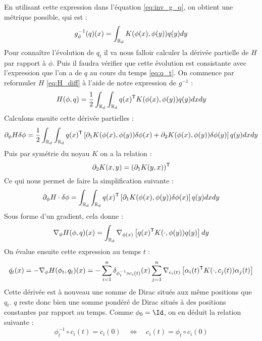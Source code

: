 En utilisant cette expression dans l'équation \eqref{eq:inv_g_q}, on obtient une métrique possible, qui est :
\begin{equation}
	g_\phi^{-1}(q)(x) = \int_{\mathbb{R}_d} K(\phi(x), \phi(y)) q(y) dy
\end{equation}
Pour connaître l'évolution de $q_t$ il va nous falloir calculer la dérivée partielle de $H$ par rapport à $\phi$. Puis il faudra vérifier que cette évolution est consistante avec l'expression que l'on a de $q$ au cours du temps \eqref{eq:q_t}. On commence par reformuler $H$ \eqref{eq:H_diff} à l'aide de notre expression de $g^{-1}$ :
\begin{equation}
	H(\phi, q) = \frac{1}{2} \int_{\mathbb{R}_d} \int_{\mathbb{R}_d} q(x)^{\mathsf{T}} K(\phi(x), \phi(y)) q(y) dx dy
\end{equation}
Calculons ensuite cette dérivée partielles :
\begin{equation}
	\partial_\phi H \delta \phi = \frac{1}{2} \int_{\mathbb{R}_d} \int_{\mathbb{R}_d} q(x)^{\mathsf{T}} \left[ \partial_1 K(\phi(x), \phi(y)) \delta \phi(x) + \partial_2 K(\phi(x), \phi(y)) \delta \phi(y) \right] q(y) dx dy
\end{equation}
Puis par symétrie du noyau $K$ on a la relation :
\begin{equation}
	\partial_2 K(x, y) = (\partial_1 K(y, x))^{\mathsf{T}}
\end{equation}
Ce qui nous permet de faire la simplification suivante :
\begin{equation}
	\partial_\phi H \cdot \delta \phi = \int_{\mathbb{R}_d} \int_{\mathbb{R}_d} q(x)^{\mathsf{T}} \left[ \partial_1 K(\phi(x), \phi(y)) \delta \phi(x) \right] q(y) dx dy
\end{equation}
Sous forme d'un gradient, cela donne :
\begin{equation}
	\nabla_\phi H(\phi, q)(x) = \int_{\mathbb{R}_d} \nabla_{\phi(x)} \left[ q(x)^{\mathsf{T}} K(\cdot, \phi(y)) q(y) \right] dy
\end{equation}
On évalue ensuite cette expression au temps $t$ :
\begin{equation}
	\dot{q_t}(x) = - \nabla_\phi H(\phi_t, q_t) (x) = - \sum_{i=1}^n \delta_{\phi_t^{-1} \circ c_i(t)}(x) \sum_{j=1}^n \nabla_{c_i(t)} \left[ \alpha_i(t)^{\mathsf{T}} K(\cdot, c_j(t)) \alpha_j(t) \right]
\end{equation}
Cette dérivée est à nouveau une somme de Dirac situés aux même positions que $q_t$. $q$ reste donc bien une somme pondéré de Dirac situés à des positions constantes par rapport au temps. Comme $\phi_0 = \Id$, on en déduit la relation suivante :
\begin{equation}
	\label{eq:c_cons}
	\phi_t^{-1} \circ c_i(t) = c_i(0) \quad \Leftrightarrow \quad c_i(t) = \phi_t \circ c_i(0)
\end{equation}
